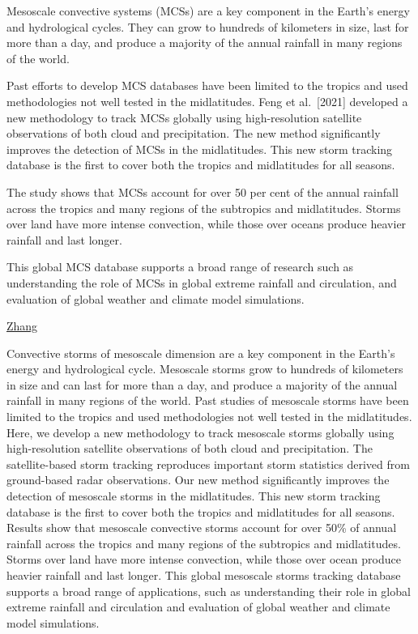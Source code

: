 \documentclass[
]{book}
\begin{document}
Mesoscale convective systems (MCSs) are a key component in the Earth's energy and hydrological cycles. They can grow to hundreds of kilometers in size, last for more than a day, and produce a majority of the annual rainfall in many regions of the world.

Past efforts to develop MCS databases have been limited to the tropics and used methodologies not well tested in the midlatitudes. Feng et al.~{[}2021{]} developed a new methodology to track MCSs globally using high-resolution satellite observations of both cloud and precipitation. The new method significantly improves the detection of MCSs in the midlatitudes. This new storm tracking database is the first to cover both the tropics and midlatitudes for all seasons.

The study shows that MCSs account for over 50 per cent of the annual rainfall across the tropics and many regions of the subtropics and midlatitudes. Storms over land have more intense convection, while those over oceans produce heavier rainfall and last longer.

This global MCS database supports a broad range of research such as understanding the role of MCSs in global extreme rainfall and circulation, and evaluation of global weather and climate model simulations.

\href{https://eos.org/editor-highlights/new-global-mesoscale-convective-system-tracking-database}{Zhang}

Convective storms of mesoscale dimension are a key component
in the Earth's energy and hydrological cycle. Mesoscale storms grow to hundreds of kilometers in size
and can last for more than a day, and produce a majority of the annual rainfall in many regions of the
world. Past studies of mesoscale storms have been limited to the tropics and used methodologies not well
tested in the midlatitudes. Here, we develop a new methodology to track mesoscale storms globally using
high-resolution satellite observations of both cloud and precipitation. The satellite-based storm tracking
reproduces important storm statistics derived from ground-based radar observations. Our new method
significantly improves the detection of mesoscale storms in the midlatitudes. This new storm tracking
database is the first to cover both the tropics and midlatitudes for all seasons. Results show that mesoscale
convective storms account for over 50\% of annual rainfall across the tropics and many regions of the
subtropics and midlatitudes. Storms over land have more intense convection, while those over ocean
produce heavier rainfall and last longer. This global mesoscale storms tracking database supports a broad
range of applications, such as understanding their role in global extreme rainfall and circulation and
evaluation of global weather and climate model simulations.
\end{document}
